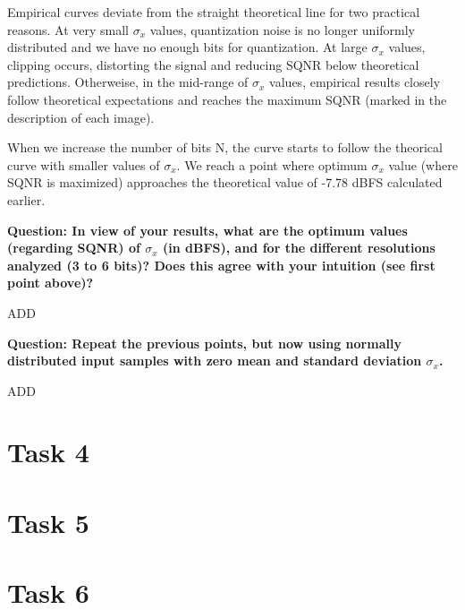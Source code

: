 \documentclass[11pt,a4paper]{article}
\begin{document}
Empirical curves deviate from the straight theoretical line for two practical reasons. At very small $\sigma_x$ values, quantization noise is no longer uniformly distributed and we have no enough bits for quantization.
At large $\sigma_x$ values, clipping occurs, distorting the signal and reducing SQNR below theoretical predictions.
Otherweise, in the mid-range of $\sigma_x$ values, empirical results closely follow theoretical expectations and reaches the maximum SQNR (marked in the description of each image).

When we increase the number of bits N, the curve starts to follow the theorical curve with smaller values of $\sigma_x$.
We reach a point where optimum $\sigma_x$ value (where SQNR is maximized) approaches the theoretical value of -7.78 dBFS calculated earlier.

\vspace{1cm}
\textbf{Question: In view of your results, what are the optimum values (regarding SQNR) of $\sigma_x$ (in dBFS), and for the different resolutions analyzed (3 to 6 bits)?
    Does this agree with your intuition (see first point above)?
}
\vspace{0.5cm}

ADD

\vspace{1cm}
\textbf{Question: Repeat the previous points, but now using normally distributed input samples with zero mean and standard deviation $\sigma_x$.
}
\vspace{0.5cm}

ADD

\vspace{0.5cm}
\section{Task 4}


\vspace{0.5cm}
\section{Task 5}


\vspace{0.5cm}
\section{Task 6}



\end{document}
